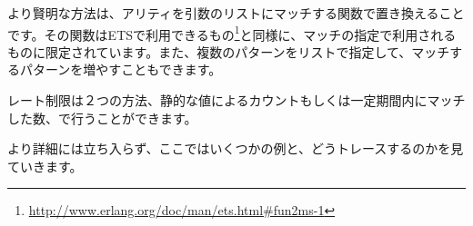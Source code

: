 より賢明な方法は、アリティを引数のリストにマッチする関数で置き換えることです。その関数はETSで利用できるもの\footnote{\href{http://www.erlang.org/doc/man/ets.html\#fun2ms-1}{http://www.erlang.org/doc/man/ets.html\#fun2ms-1}}と同様に、マッチの指定で利用されるものに限定されています。また、複数のパターンをリストで指定して、マッチするパターンを増やすこともできます。

レート制限は２つの方法、静的な値によるカウントもしくは一定期間内にマッチした数、で行うことができます。

より詳細には立ち入らず、ここではいくつかの例と、どうトレースするのかを見ていきます。

% 
% 
% 
% 
% 
% 
% 
% 
% 
% 

